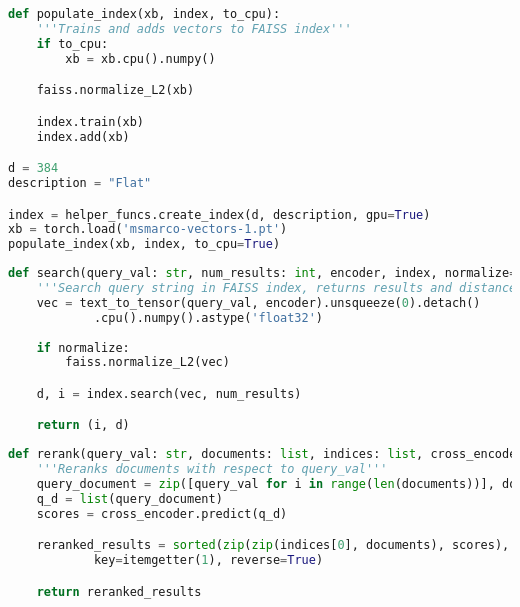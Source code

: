 \newpage

\begin{lstlisting}[language=Python, caption={Dodawanie rekordów do indeksu\protect\footnotemark[3]}]
def populate_index(xb, index, to_cpu):
    '''Trains and adds vectors to FAISS index'''
    if to_cpu:
        xb = xb.cpu().numpy()

    faiss.normalize_L2(xb)

    index.train(xb)
    index.add(xb)

d = 384
description = "Flat"

index = helper_funcs.create_index(d, description, gpu=True)
xb = torch.load('msmarco-vectors-1.pt')
populate_index(xb, index, to_cpu=True)
\end{lstlisting}

\begin{lstlisting}[language=Python, caption={Wyszukiwanie zasobów\protect\footnotemark[3]}]
def search(query_val: str, num_results: int, encoder, index, normalize=True):
    '''Search query string in FAISS index, returns results and distances'''
    vec = text_to_tensor(query_val, encoder).unsqueeze(0).detach()
            .cpu().numpy().astype('float32')
    
    if normalize:
        faiss.normalize_L2(vec)

    d, i = index.search(vec, num_results)

    return (i, d)
\end{lstlisting}

\begin{lstlisting}[language=Python, caption={Ponowny ranking\protect\footnotemark[3]}]
def rerank(query_val: str, documents: list, indices: list, cross_encoder):
    '''Reranks documents with respect to query_val'''
    query_document = zip([query_val for i in range(len(documents))], documents)
    q_d = list(query_document)
    scores = cross_encoder.predict(q_d)

    reranked_results = sorted(zip(zip(indices[0], documents), scores),
            key=itemgetter(1), reverse=True)

    return reranked_results
\end{lstlisting}

